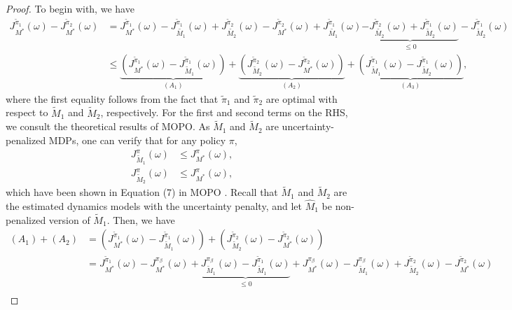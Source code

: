 \begin{proof}
To begin with, we have
\begin{align}
    J^{\widetilde{\pi}_1}_{M^*}(\omega) - J^{\widetilde{\pi}_2}_{M^*}(\omega) 
    &= J^{\widetilde{\pi}_1}_{M^*}(\omega) - J^{\widetilde{\pi}_1}_{\widetilde{M_1}}(\omega) + J^{\widetilde{\pi}_2}_{\widetilde{M_2}}(\omega) - J^{\widetilde{\pi}_2}_{M^*}(\omega) +
     J^{\widetilde{\pi}_1}_{\widetilde{M_1}}(\omega) \underbrace{- J^{\widetilde{\pi}_2}_{\widetilde{M_2}}(\omega) + J^{\widetilde{\pi}_1}_{\widetilde{M}_2}(\omega)}_{\leq 0} - J^{\widetilde{\pi}_1}_{\widetilde{M}_2}(\omega) \\
    &\le \underbrace{\left(J^{\widetilde{\pi}_1}_{M^*}(\omega) - J^{\widetilde{\pi}_1}_{\widetilde{M}_1}(\omega)\right)}_{(A_1)}+ \underbrace{\left(J^{\widetilde{\pi}_2}_{\widetilde{M}_2}(\omega) - J^{\widetilde{\pi}_2}_{M^*}(\omega)\right)}_{(A_2)}
    + \underbrace{\left(J^{\widetilde{\pi}_1}_{\widetilde{M}_1}(\omega) - J^{\widetilde{\pi}_1}_{\widetilde{M}_2}(\omega)\right)}_{(A_3)},
\end{align}
where the first equality follows from the fact that $\widetilde{\pi}_1$ and $\widetilde{\pi}_2$ are optimal with respect to $\widetilde{M}_1$ and $\widetilde{M}_2$, respectively.
For the first and second terms on the RHS, we consult the theoretical results of MOPO. As $\widetilde{M}_1$ and $\widetilde{M}_2$ are uncertainty-penalized MDPs, one can verify that for any policy $\pi$,
\begin{align}
    J^{{\pi}}_{\widetilde{M}_1}(\omega) &\leq J^{{\pi}}_{M^*}(\omega),\\
    J^{{\pi}}_{\widetilde{M}_2}(\omega) &\leq J^{{\pi}}_{M^*}(\omega),
\end{align}
which have been shown in Equation (7) in MOPO \citep{yu2020mopo}.
Recall that $\widetilde{M}_1$ and $\widetilde{M}_2$ are the estimated dynamics models with the uncertainty penalty, and let $\widehat{M}_1$ be non-penalized version of $\widetilde{M}_1$. Then, we have 
\begin{align}
    (A_1)+(A_2) &=\left(J^{\widetilde{\pi}_1}_{M^*}(\omega) - J^{\widetilde{\pi}_1}_{\widetilde{M}_1}(\omega) \right)+ \left(J^{\widetilde{\pi}_2}_{\widetilde{M}_2}(\omega) - J^{\widetilde{\pi}_2}_{M^*}(\omega)\right) \\
    &= J^{\widetilde{\pi}_1}_{M^*}(\omega) - J^{{\pi}_\beta}_{M^*}(\omega) + \underbrace{J^{{\pi}_\beta}_{\widetilde{M}_1}(\omega) -J^{\widetilde{\pi}_1}_{\widetilde{M}_1}(\omega)}_{\leq 0} + J^{{\pi}_\beta}_{M^*}(\omega) - J^{{\pi}_\beta}_{\widetilde{M}_1}(\omega) + {J^{\widetilde{\pi}_2}_{\widetilde{M}_2}(\omega) - J^{\widetilde{\pi}_2}_{M^*}(\omega)} \\ 

\end{align}
\end{proof}
